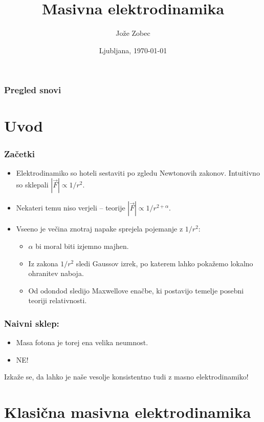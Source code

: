 \documentclass{beamer}
\title{Masivna elektrodinamika}
\author{Jože Zobec}
\date{Ljubljana, \today}
\institute{Mentor: Borut Bajc}
\newcommand{\F}{
	\ensuremath{\vec{F}}
}
\begin{document}
\begin{frame}
	\titlepage
\end{frame}

\begin{frame}[t]
	\frametitle{Pregled snovi}
	\tableofcontents
\end{frame}

\section{Uvod}

\begin{frame}[t]
	\frametitle{Začetki}
	\begin{itemize}
		\item{Elektrodinamiko so hoteli sestaviti po zgledu Newtonovih zakonov. Intuitivno so sklepali $|\F| \propto 1/r^2$.}
		\item{Nekateri temu niso verjeli -- teorije $|\F| \propto 1/r^{2+\alpha}$.}
		\item{Vseeno je večina znotraj napake sprejela pojemanje z $1/r^2$:}
		\begin{itemize}
			\item{$\alpha$ bi moral biti izjemno majhen.}
			\item{Iz zakona $1/r^2$ sledi Gaussov izrek, po katerem lahko pokažemo lokalno ohranitev naboja.}
			\item{Od odondod sledijo Maxwellove enačbe, ki postavijo temelje posebni teoriji relativnosti.}
		\end{itemize}
	\end{itemize}
\end{frame}

\begin{frame}[c]
	\frametitle{Naivni sklep:}
	\begin{itemize}
		\item{Masa fotona je torej ena velika neumnost.}
		\item{NE!}
	\end{itemize}
	Izkaže se, da lahko je naše vesolje konsistentno tudi z masno elektrodinamiko!
\end{frame}

\section{Klasična masivna elektrodinamika}
\end{document}
